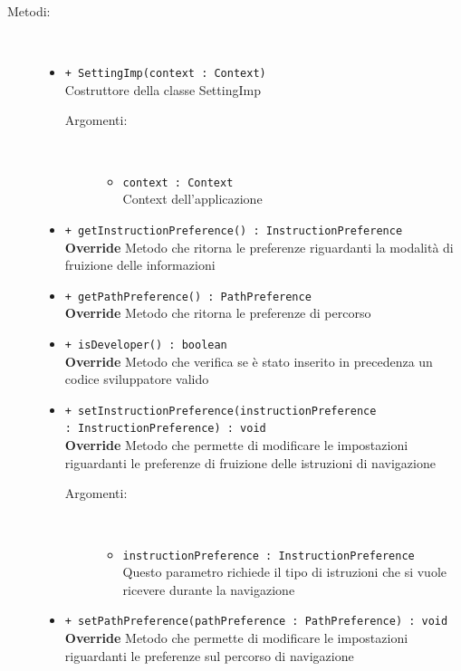 \documentclass[../DefinizioneDiProdotto.tex]{subfiles}
\begin{document}
\begin{description}
\begin{itemize}
	\end{itemize}
	\item[Metodi:] \
	\begin{itemize}
		\item \texttt{+ SettingImp(context : Context)}\\
		Costruttore della classe SettingImp
		\begin{description}
			\item[Argomenti:] \
			\begin{itemize}
				\item \texttt{context : Context}\\
				Context dell'applicazione\end{itemize}
		\end{description}
		\item \texttt{+ getInstructionPreference() : InstructionPreference}\\
		\textbf{Override} Metodo che ritorna le preferenze riguardanti la modalità di fruizione delle informazioni
		\item \texttt{+ getPathPreference() : PathPreference}\\
		\textbf{Override} Metodo che ritorna le preferenze di percorso
		\item \texttt{+ isDeveloper() : boolean}\\
		\textbf{Override} Metodo che verifica se è stato inserito in precedenza un codice sviluppatore valido
		\item \texttt{+ setInstructionPreference(instructionPreference \\ : InstructionPreference) : void}\\
		\textbf{Override} Metodo che permette di modificare le impostazioni riguardanti le preferenze di fruizione delle istruzioni di navigazione
		\begin{description}
			\item[Argomenti:] \
			\begin{itemize}
				\item \texttt{instructionPreference : InstructionPreference}\\
				Questo parametro richiede il tipo di istruzioni che si vuole ricevere durante la navigazione \end{itemize}
		\end{description}
		\item \texttt{+ setPathPreference(pathPreference : PathPreference) : void}\\
		\textbf{Override} Metodo che permette di modificare le impostazioni riguardanti le preferenze sul percorso di navigazione

\end{itemize}
\end{description}
\end{document}
